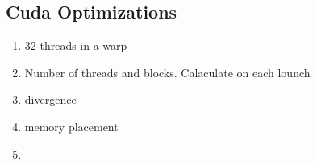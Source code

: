 


\subsection*{Cuda Optimizations}

\begin{enumerate}
\item 32 threads in a warp
\item Number of threads and blocks. Calaculate on each lounch
\item divergence
\item memory placement
\item
\end{enumerate}

\cleardoublepage
